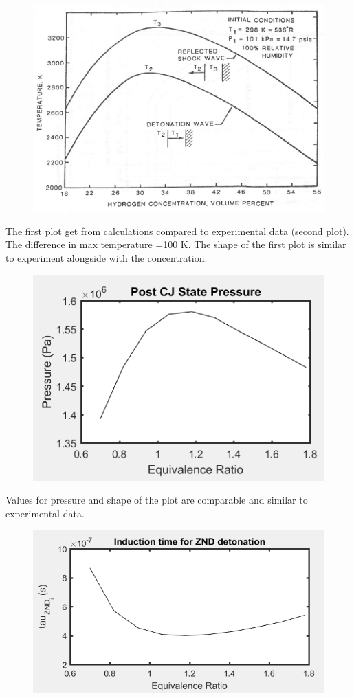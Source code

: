 \documentclass[11pt]{article}
\begin{document}
\begin{figure} [H]
	\begin{center}
    \includegraphics[height=0.5\textwidth]{E1}
    \end{center}
\end{figure}
The first plot get from calculations compared to experimental data (second plot). The difference in max temperature =100 K. The shape of the first plot is similar to experiment alongside with the concentration.
\begin{figure} [H]
	\begin{center}
\includegraphics[height=0.5\textwidth]{P2}
    \end{center}
\end{figure}
Values for pressure and shape of the plot are comparable and similar to experimental data.
\begin{figure} [H]
	\begin{center}
\includegraphics[height=0.5\textwidth]{P3}
    \end{center}
\end{figure}
\end{document}
